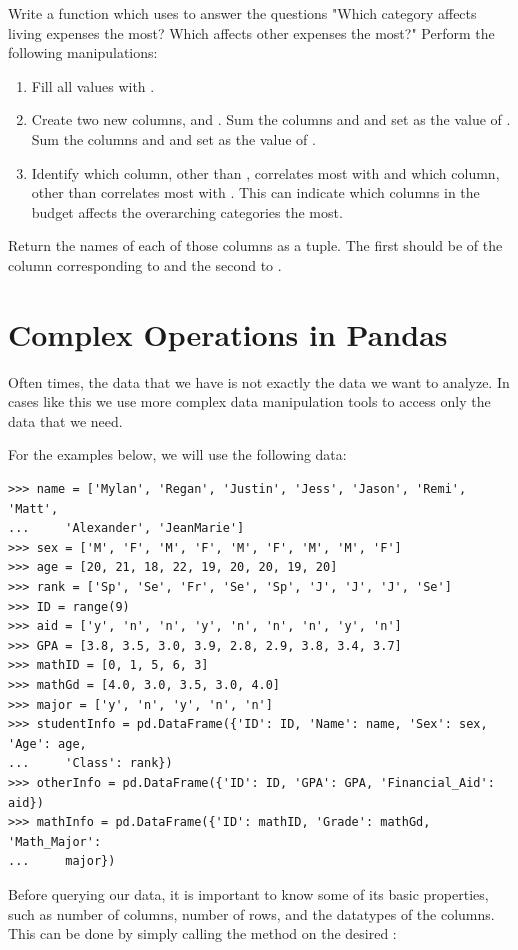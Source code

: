 \begin{problem}
Write a function which uses  to answer the questions "Which category affects living expenses the most? Which affects other expenses the most?"
Perform the following manipulations:
\begin{enumerate}
\item Fill all  values with .
\item Create two new columns,  and .
Sum the columns  and  and set as the value of .
Sum the columns  and  and set as the value of .
\item Identify which column, other than , correlates most with  and which column, other than  correlates most with .
This can indicate which columns in the budget affects the overarching categories the most.
\end{enumerate}
Return the names of each of those columns as a tuple.
The first should be of the column corresponding to  and the second to .
\end{problem}

\section*{Complex Operations in Pandas}
Often times, the data that we have is not exactly the data we want to analyze.
In cases like this we use more complex data manipulation tools to access only the data that we need.

For the examples below, we will use the following data:
\begin{lstlisting}
>>> name = ['Mylan', 'Regan', 'Justin', 'Jess', 'Jason', 'Remi', 'Matt',
...		'Alexander', 'JeanMarie']
>>> sex = ['M', 'F', 'M', 'F', 'M', 'F', 'M', 'M', 'F']
>>> age = [20, 21, 18, 22, 19, 20, 20, 19, 20]
>>> rank = ['Sp', 'Se', 'Fr', 'Se', 'Sp', 'J', 'J', 'J', 'Se']
>>> ID = range(9)
>>> aid = ['y', 'n', 'n', 'y', 'n', 'n', 'n', 'y', 'n']
>>> GPA = [3.8, 3.5, 3.0, 3.9, 2.8, 2.9, 3.8, 3.4, 3.7]
>>> mathID = [0, 1, 5, 6, 3]
>>> mathGd = [4.0, 3.0, 3.5, 3.0, 4.0]
>>> major = ['y', 'n', 'y', 'n', 'n']
>>> studentInfo = pd.DataFrame({'ID': ID, 'Name': name, 'Sex': sex, 'Age': age,
...		'Class': rank})
>>> otherInfo = pd.DataFrame({'ID': ID, 'GPA': GPA, 'Financial_Aid': aid})
>>> mathInfo = pd.DataFrame({'ID': mathID, 'Grade': mathGd, 'Math_Major':
...		major})
\end{lstlisting}
Before querying our data, it is important to know some of its basic properties,
such as number of columns, number of rows, and the datatypes of the columns.
This can be done by simply calling the  method on the desired
:

